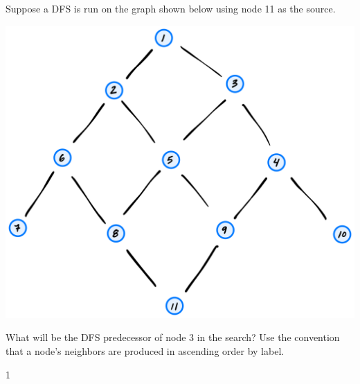 \begin{prob}
    Suppose a DFS is run on the graph shown below using node 11 as the source.

    \includegraphics[width=.6\textwidth]{./g2.png}

    What will be the DFS predecessor of node 3 in the search? Use the convention that a node's
    neighbors are produced in ascending order by label.

    \begin{soln}
        1
    \end{soln}

\end{prob}
